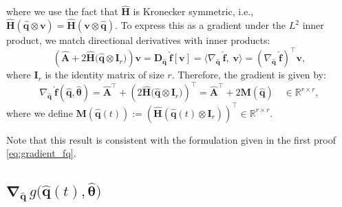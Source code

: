 where we use the fact that $\hat{\mathbf{H}}$ is Kronecker symmetric, i.e., $\hat{\mathbf{H}}(\hat{\mathbf{q}} \otimes \mathbf{v}) = \hat{\mathbf{H}}(\mathbf{v} \otimes \hat{\mathbf{q}})$.
To express this as a gradient under the $L^2$ inner product, we match directional derivatives with inner products:\\
$$
\left( \hat{\mathbf{A}} + 2\hat{\mathbf{H}}\bigl( \hat{\mathbf{q}} \otimes \mathbf{I}_r \bigr) \right) \mathbf{v} = \bm{D}_{\hat{\mathbf{q}}}~\hat{\mathbf{f}}[\mathbf{v}] = \langle \nabla_{\hat{\mathbf{q}}}~\hat{\mathbf{f}},\;\mathbf{v} \rangle = \left( \nabla_{\hat{\mathbf{q}}}~\hat{\mathbf{f}} \right)^{\top}  \mathbf{v},
$$
where $\mathbf{I}_r$ is the identity matrix of size $r$. Therefore, the gradient is given by:\\
\begin{equation}
    \nabla_{\hat{\mathbf{q}}}~\hat{\mathbf{f}}(\hat{\mathbf{q}}, \hat{\bm{\theta}}) = \hat{\mathbf{A}}^{\top} + \left( 2\hat{\mathbf{H}}\bigl( \hat{\mathbf{q}} \otimes \mathbf{I}_r \bigr) \right)^{\top} = \hat{\mathbf{A}}^{\top} + 2\mathbf{M}(\hat{\mathbf{q}}) \quad \in \mathbb{R}^{r \times r},
    \label{eq:gradient_1}
\end{equation}
where we define $\mathbf{M}(\hat{\mathbf{q}}(t)) := \left( \hat{\mathbf{H}}( \hat{\mathbf{q}}(t) \otimes \mathbf{I}_r ) \right)^{\top} \in \mathbb{R}^{r \times r}$.

Note that this result is consistent with the formulation given in the first proof \eqref{eq:gradient_fq}.


\subsection{$\bm{\nabla}_{\hat{\mathbf{q}}}\,g\bigl(\hat{\mathbf{q}}(t),\hat{\bm{\theta}}\bigr)$}

